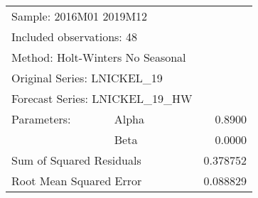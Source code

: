 \begin{tabular}{lrrrr}
\toprule
\multicolumn{3}{l}{Sample: 2016M01 2019M12}&\multicolumn{1}{c}{}&\multicolumn{1}{c}{}\\
\multicolumn{3}{l}{Included observations: 48}&\multicolumn{1}{c}{}&\multicolumn{1}{c}{}\\
\multicolumn{4}{l}{Method: Holt-Winters No Seasonal}&\multicolumn{1}{c}{}\\
\multicolumn{3}{l}{Original Series: LNICKEL\_19}&\multicolumn{1}{c}{}&\multicolumn{1}{c}{}\\
\multicolumn{4}{l}{Forecast Series: LNICKEL\_19\_HW}&\multicolumn{1}{c}{}\\
\midrule
\multicolumn{1}{l}{Parameters:}&\multicolumn{1}{l}{Alpha}&\multicolumn{1}{c}{}&\multicolumn{1}{c}{}&\multicolumn{1}{r}{0.8900}\\
\multicolumn{1}{c}{}&\multicolumn{1}{l}{Beta}&\multicolumn{1}{c}{}&\multicolumn{1}{c}{}&\multicolumn{1}{r}{0.0000}\\
\multicolumn{3}{l}{Sum of Squared Residuals}&\multicolumn{1}{c}{}&\multicolumn{1}{r}{0.378752}\\
\multicolumn{3}{l}{Root Mean Squared Error}&\multicolumn{1}{c}{}&\multicolumn{1}{r}{0.088829}\\
\bottomrule
\end{tabular}

